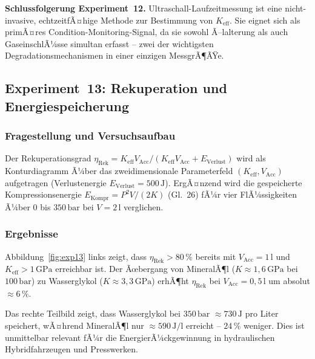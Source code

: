 ﻿\documentclass[a4paper,12pt]{scrreprt}
\theoremstyle{definition}
\begin{document}
\begin{infobox}
\textbf{Schlussfolgerung Experiment~12.}
Ultraschall-Laufzeitmessung ist eine nicht-invasive, echtzeitfÃ¤hige Methode
zur Bestimmung von $K_{\mathrm{eff}}$. Sie eignet sich als primÃ¤res
Condition-Monitoring-Signal, da sie sowohl Ã–lalterung als auch
GaseinschlÃ¼sse simultan erfasst -- zwei der wichtigsten Degradationsmechanismen
in einer einzigen MessgrÃ¶ÃŸe.
\end{infobox}

\subsection{Experiment~13: Rekuperation und Energiespeicherung}
\label{sec:exp13}

\subsubsection*{Fragestellung und Versuchsaufbau}

Der Rekuperationsgrad $\eta_{\mathrm{Rek}} = K_{\mathrm{eff}} V_{\mathrm{Acc}} / (K_{\mathrm{eff}} V_{\mathrm{Acc}} + E_{\mathrm{Verlust}})$
wird als Konturdiagramm Ã¼ber das zweidimensionale Parameterfeld
$(K_{\mathrm{eff}}, V_{\mathrm{Acc}})$ aufgetragen (Verlustenergie
$E_{\mathrm{Verlust}} = 500\,\mathrm{J}$). ErgÃ¤nzend wird die
gespeicherte Kompressionsenergie $E_{\mathrm{Kompr}} = P^2 V / (2K)$
(Gl.~26) fÃ¼r vier FlÃ¼ssigkeiten Ã¼ber $0$ bis $350\,\mathrm{bar}$
bei $V = 2\,\mathrm{l}$ verglichen.

\subsubsection*{Ergebnisse}

Abbildung~\ref{fig:exp13} links zeigt, dass $\eta_{\mathrm{Rek}} > 80\,\%$
bereits mit $V_{\mathrm{Acc}} = 1\,\mathrm{l}$ und $K_{\mathrm{eff}} > 1\,\mathrm{GPa}$
erreichbar ist. Der Ãœbergang von MineralÃ¶l ($K \approx 1{,}6\,\mathrm{GPa}$ bei
$100\,\mathrm{bar}$) zu Wasserglykol ($K \approx 3{,}3\,\mathrm{GPa}$)
erhÃ¶ht $\eta_{\mathrm{Rek}}$ bei $V_{\mathrm{Acc}} = 0{,}5\,\mathrm{l}$
um absolut $\approx 6\,\%$.

Das rechte Teilbild zeigt, dass Wasserglykol bei $350\,\mathrm{bar}$
$\approx 730\,\mathrm{J}$ pro Liter speichert, wÃ¤hrend MineralÃ¶l
nur $\approx 590\,\mathrm{J}/\mathrm{l}$ erreicht -- $24\,\%$ weniger.
Dies ist unmittelbar relevant fÃ¼r die EnergierÃ¼ckgewinnung in
hydraulischen Hybridfahrzeugen und Presswerken.
\end{document}

